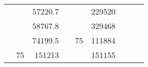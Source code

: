 \begin{table}[H]
\begin{tabular}{|ccrccrccc}
\multicolumn{1}{|c|}{\cellcolor[HTML]{FFFFC7}}                                & \multicolumn{1}{c|}{\cellcolor[HTML]{DAE8FC}}                      & \multicolumn{1}{r|}{\cellcolor[HTML]{DAE8FC}57220.7}   & \multicolumn{1}{c|}{\cellcolor[HTML]{FFFFC7}}                                & \multicolumn{1}{c|}{\cellcolor[HTML]{DAE8FC}}                       & \multicolumn{1}{r|}{\cellcolor[HTML]{DDFDFF}229520}    &                                                                              &                                                                    &                                                        \\ \cline{3-3} \cline{6-6}
\multicolumn{1}{|c|}{\cellcolor[HTML]{FFFFC7}}                                & \multicolumn{1}{c|}{\cellcolor[HTML]{DAE8FC}}                      & \multicolumn{1}{r|}{\cellcolor[HTML]{DDFDFF}58767.8}   & \multicolumn{1}{c|}{\cellcolor[HTML]{FFFFC7}}                                & \multicolumn{1}{c|}{\cellcolor[HTML]{DAE8FC}}                       & \multicolumn{1}{r|}{\cellcolor[HTML]{DAE8FC}329468}    &                                                                              &                                                                    &                                                        \\ \cline{3-3} \cline{6-6}
\multicolumn{1}{|c|}{\cellcolor[HTML]{FFFFC7}}                                & \multicolumn{1}{c|}{\cellcolor[HTML]{DAE8FC}}                      & \multicolumn{1}{r|}{\cellcolor[HTML]{DAE8FC}74199.5}   & \multicolumn{1}{c|}{\cellcolor[HTML]{FFFFC7}}                                & \multicolumn{1}{c|}{\multirow{-10}{*}{\cellcolor[HTML]{DAE8FC}75}}  & \multicolumn{1}{r|}{\cellcolor[HTML]{DDFDFF}111884}    &                                                                              &                                                                    &                                                        \\ \cline{3-3} \cline{5-6}
\multicolumn{1}{|c|}{\cellcolor[HTML]{FFFFC7}}                                & \multicolumn{1}{c|}{\multirow{-10}{*}{\cellcolor[HTML]{DAE8FC}75}} & \multicolumn{1}{r|}{\cellcolor[HTML]{DDFDFF}151213}    & \multicolumn{1}{c|}{\cellcolor[HTML]{FFFFC7}}                                & \multicolumn{1}{c|}{\cellcolor[HTML]{DDFDFF}}                       & \multicolumn{1}{r|}{\cellcolor[HTML]{DAE8FC}151155}    &                                                                              &                                                                    &                                                        \\ \cline{2-3} \cline{6-6}

\end{tabular}
\end{table}
